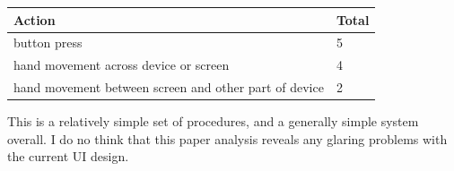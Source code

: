 \documentclass[12pt, letter]{article}
\begin{document}
\vspace{.25cm}

\begin{tabular}[H]{|p{10cm}|p{2cm}|}
\hline
Action & Total \\
\hline
button press & 5 \\
hand movement across device or screen & 4 \\
hand movement between screen and other part of device & 2 \\
\hline
\end{tabular}

\hfill

This is a relatively simple set of procedures, and a generally simple system overall.  I do no think that this paper analysis reveals any glaring problems with the current UI design.
\end{document}
